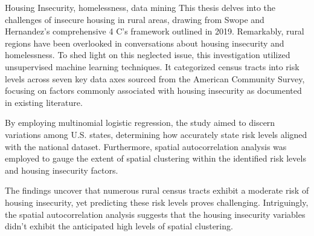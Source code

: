 
\begin{abstract}
This thesis explores rural housing insecurity through Swope and Hernandez’s (2019) 4 C's of housing insecurity in rural areas. Little attention has been paid to rural areas in the conversation on housing insecurity and houselessness. To facilitate further discussion on this understudied issue, this exploratory study used unsupervised machine learning to group census tracts into risk levels across 7 axes of data from the American Community Survey. These were based on housing insecurity factors found in the literature. Multinomial logistic regression was used to determine variation between U.S. states based on how well state risk levels could be predicted with the national dataset. Additionally, spatial autocorrelation was used to analyze how spatially clustered the risk levels and housing insecurity risk variables.  The results indicate that many rural census tracts have a medium risk of housing insecurity, and the risk levels are hard to predict. The spatial autocorrelation results show that the housing insecurity variables were not as highly spatially clustered as expected.  
\end{abstract}

\begin{layabstract}{Housing Insecurity, homelessness, data mining}	%
This thesis delves into the challenges of insecure housing in rural areas, drawing from Swope and Hernandez's comprehensive 4 C's framework outlined in 2019. Remarkably, rural regions have been overlooked in conversations about housing insecurity and homelessness. To shed light on this neglected issue, this investigation utilized unsupervised machine learning techniques. It categorized census tracts into risk levels across seven key data axes sourced from the American Community Survey, focusing on factors commonly associated with housing insecurity as documented in existing literature.

By employing multinomial logistic regression, the study aimed to discern variations among U.S. states, determining how accurately state risk levels aligned with the national dataset. Furthermore, spatial autocorrelation analysis was employed to gauge the extent of spatial clustering within the identified risk levels and housing insecurity factors.

The findings uncover that numerous rural census tracts exhibit a moderate risk of housing insecurity, yet predicting these risk levels proves challenging. Intriguingly, the spatial autocorrelation analysis suggests that the housing insecurity variables didn't exhibit the anticipated high levels of spatial clustering.


\end{layabstract}

